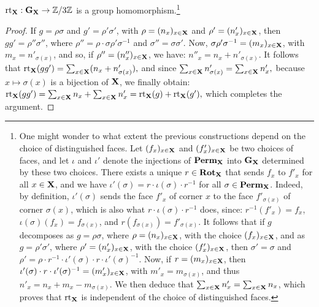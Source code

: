 \begin{itemize}
    \begin{lemma}
        $\mathrm{rt}_{\mathbf{X}} : \mathbf{G}_{\mathbf{X}} \to \mathbb{Z} / 3 \mathbb{Z}$ is a group homomorphism.\footnote{One might wonder to what extent the previous constructions depend on the choice of distinguished faces. Let $(f_x)_{x \in \mathbf{X}}$ and $(f'_{x})_{x \in \mathbf{X}}$ be two choices of faces, and let $\iota$ and $\iota'$ denote the injections of $\mathbf{Perm}_{\mathbf{X}}$ into $\mathbf{G}_{\mathbf{X}}$ determined by these two choices.
        There exists a unique $r \in \mathbf{Rot}_{\mathbf{X}}$ that sends $f_x$ to $f'_{x}$ for all $x \in \mathbf{X}$, and we have $\iota'(\sigma) = r \cdot \iota(\sigma) \cdot r^{-1}$ for all $\sigma \in \mathbf{Perm}_{\mathbf{X}}$. Indeed, by definition, $\iota'(\sigma)$ sends the face $f'_{x}$ of corner $x$ to the face $f'_{\sigma(x)}$ of corner $\sigma(x)$, which is also what $r \cdot \iota(\sigma) \cdot r^{-1}$ does, since: $r^{-1}(f'_{x}) = f_{x}$, $\iota(\sigma)(f_{x}) = f_{\sigma(x)}$, and $r(f_{\sigma(x)}) = f'_{\sigma(x)}$. It follows that if $g$ decomposes as $g = \rho\sigma$, where $\rho = (n_{x})_{x \in \mathbf{X}}$, with the choice $(f_{x})_{x \in \mathbf{X}}$, and as $g = \rho'\sigma'$, where $\rho' = (n'_{x})_{x \in \mathbf{X}}$, with the choice $(f'_{x})_{x \in \mathbf{X}}$, then $\sigma' = \sigma$ and $\rho' = \rho \cdot r^{-1} \cdot \iota'(\sigma) \cdot r \cdot \iota'(\sigma)^{-1}$.
        Now, if $r = (m_{x})_{x \in \mathbf{X}}$, then $\iota'(\sigma) \cdot r \cdot \iota'(\sigma)^{-1} = (m'_{x})_{x \in \mathbf{X}}$, with $m'_{x} = m_{\sigma(x)}$, and thus $n'_{x} = n_{x} + m_{x} - m_{\sigma(x)}$. We then deduce that $\sum_{x \in \mathbf{X}} n'_{x} = \sum_{x \in \mathbf{X}} n_{x}$, which proves that $\mathrm{rt}_{\mathbf{X}}$ is independent of the choice of distinguished faces.}
    \end{lemma}
    \begin{proof}
        If $g = \rho \sigma$ and $g' = \rho' \sigma'$, with $\rho = (n_x)_{x \in \mathbf{X}}$ and $\rho' = (n'_{x})_{x \in \mathbf{X}}$, then $gg' = \rho'' \sigma''$, where
        $\rho'' = \rho \cdot \sigma \rho' \sigma^{-1}$ and $\sigma'' = \sigma \sigma'$.
        Now, $\sigma \rho' \sigma^{-1} = (m_x)_{x \in \mathbf{X}}$, with $m_x = n'_{\sigma(x)}$, and so, if $\rho'' = (n''_{x})_{x \in \mathbf{X}}$, we have:
        $n''_{x} = n_{x} + n'_{\sigma(x)}$.
        It follows that
        $\mathrm{rt}_{\mathbf{X}}(gg') = \sum_{x \in \mathbf{X}} (n_{x} + n'_{\sigma(x)}),$
        and since
        $\sum_{x \in \mathbf{X}} n'_{\sigma(x)} = \sum_{x \in \mathbf{X}} n'_{x},$
        because $x \mapsto \sigma(x)$ is a bijection of $\mathbf{X}$, we finally obtain:
        $\mathrm{rt}_{\mathbf{X}}(gg') = \sum_{x \in \mathbf{X}} n_{x} + \sum_{x \in \mathbf{X}} n'_{x} = \mathrm{rt}_{\mathbf{X}}(g) + \mathrm{rt}_{\mathbf{X}}(g'),$
        which completes the argument.
    \end{proof}


\end{itemize}
